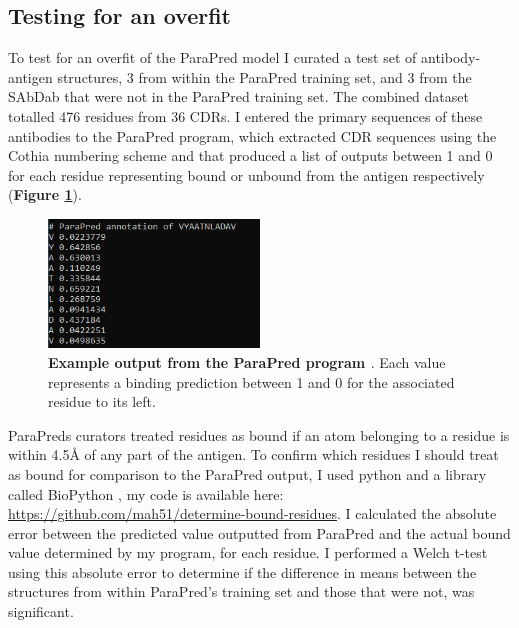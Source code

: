 \subsection{Testing for an overfit}
To test for an overfit of the ParaPred model \cite{liberisParapredAntibodyParatope2018} I curated a test set of antibody-antigen structures, 3 from within the ParaPred training set, and 3 from the SAbDab \cite{dunbarSAbDabStructuralAntibody2014} that were not in the ParaPred training set. The combined dataset totalled 476 residues from 36 CDRs. I entered the primary sequences of these antibodies to the ParaPred program, which extracted CDR sequences using the Cothia numbering scheme \cite{al-lazikaniStandardConformationsCanonical1997} and that produced a list of outputs between 1 and 0 for each residue representing bound or unbound from the antigen respectively (\textbf{Figure \ref{fig:ParaPredOutput}}). 

\begin{figure}[H]
    \begin{small}
        \begin{center}
            \includegraphics[width=0.5\textwidth]{./images/parapred_output.png}
        \end{center}
        \caption{\textbf{Example output from the ParaPred program \cite{liberisParapredAntibodyParatope2018}}. Each value represents a binding prediction between 1 and 0 for the associated residue to its left.}
        \label{fig:ParaPredOutput}
    \end{small}
\end{figure}

ParaPreds curators treated residues as bound if an atom belonging to a residue is within 4.5Å of any part of the antigen\cite{liberisParapredAntibodyParatope2018}. To confirm which residues I should treat as bound for comparison to the ParaPred output, I used python and a library called BioPython \cite{cockBiopythonFreelyAvailable2009}, my code is available here: \href{https://github.com/mah51/determine-bound-residues}{https://github.com/mah51/determine-bound-residues}. I calculated the absolute error between the predicted value outputted from ParaPred and the actual bound value determined by my program, for each residue. I performed a Welch t-test using this absolute error to determine if the difference in means between the structures from within ParaPred's training set and those that were not, was significant.


